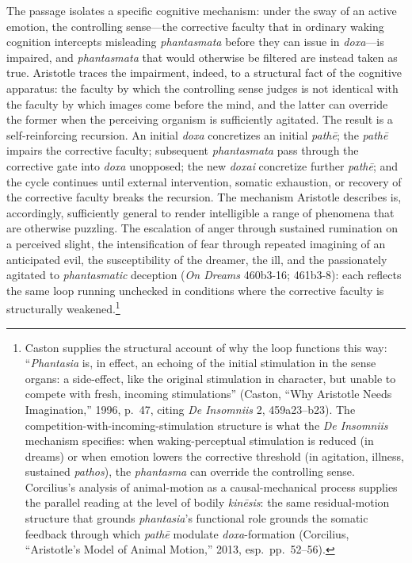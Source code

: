 \documentclass{article}
\begin{document}
The passage isolates a specific cognitive mechanism: under the sway of an active emotion, the controlling sense---the corrective faculty that in ordinary waking cognition intercepts misleading \textit{phantasmata} before they can issue in \textit{doxa}---is impaired, and \textit{phantasmata} that would otherwise be filtered are instead taken as true. Aristotle traces the impairment, indeed, to a structural fact of the cognitive apparatus: the faculty by which the controlling sense judges is not identical with the faculty by which images come before the mind, and the latter can override the former when the perceiving organism is sufficiently agitated. The result is a self-reinforcing recursion. An initial \textit{doxa} concretizes an initial \textit{path\=e}; the \textit{path\=e} impairs the corrective faculty; subsequent \textit{phantasmata} pass through the corrective gate into \textit{doxa} unopposed; the new \textit{doxai} concretize further \textit{path\=e}; and the cycle continues until external intervention, somatic exhaustion, or recovery of the corrective faculty breaks the recursion. The mechanism Aristotle describes is, accordingly, sufficiently general to render intelligible a range of phenomena that are otherwise puzzling. The escalation of anger through sustained rumination on a perceived slight, the intensification of fear through repeated imagining of an anticipated evil, the susceptibility of the dreamer, the ill, and the passionately agitated to \textit{phantasmatic} deception (\textit{On Dreams} 460b3-16; 461b3-8): each reflects the same loop running unchecked in conditions where the corrective faculty is structurally weakened.\footnote{Caston supplies the structural account of why the loop functions this way: ``\textit{Phantasia} is, in effect, an echoing of the initial stimulation in the sense organs: a side-effect, like the original stimulation in character, but unable to compete with fresh, incoming stimulations'' (Caston, ``Why Aristotle Needs Imagination,'' 1996, p.~47, citing \textit{De Insomniis} 2, 459a23--b23). The competition-with-incoming-stimulation structure is what the \textit{De Insomniis} mechanism specifies: when waking-perceptual stimulation is reduced (in dreams) or when emotion lowers the corrective threshold (in agitation, illness, sustained \textit{pathos}), the \textit{phantasma} can override the controlling sense. Corcilius's analysis of animal-motion as a causal-mechanical process supplies the parallel reading at the level of bodily \textit{kinēsis}: the same residual-motion structure that grounds \textit{phantasia}'s functional role grounds the somatic feedback through which \textit{pathē} modulate \textit{doxa}-formation (Corcilius, ``Aristotle's Model of Animal Motion,'' 2013, esp.~pp.~52--56).}
\end{document}
